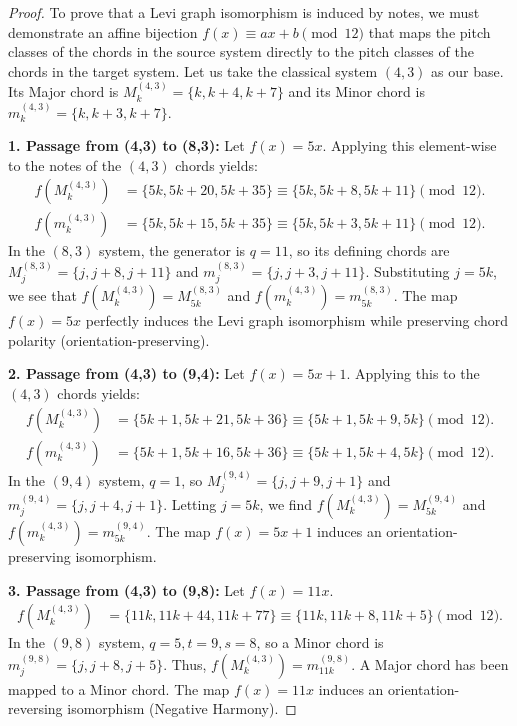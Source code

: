 \documentclass[10pt,a4paper]{amsart}
\begin{document}
\begin{proof}
To prove that a Levi graph isomorphism is induced by notes, we must demonstrate an affine bijection $f(x) \equiv ax+b \pmod{12}$ that maps the pitch classes of the chords in the source system directly to the pitch classes of the chords in the target system. Let us take the classical system $(4,3)$ as our base. Its Major chord is $M_k^{(4,3)} = \{k, k+4, k+7\}$ and its Minor chord is $m_k^{(4,3)} = \{k, k+3, k+7\}$.

\textbf{1. Passage from (4,3) to (8,3):}
Let $f(x) = 5x$. Applying this element-wise to the notes of the $(4,3)$ chords yields:
\begin{align*}
    f(M_k^{(4,3)}) &= \{5k, 5k+20, 5k+35\} \equiv \{5k, 5k+8, 5k+11\} \pmod{12}. \\
    f(m_k^{(4,3)}) &= \{5k, 5k+15, 5k+35\} \equiv \{5k, 5k+3, 5k+11\} \pmod{12}.
\end{align*}
In the $(8,3)$ system, the generator is $q=11$, so its defining chords are $M_j^{(8,3)} = \{j, j+8, j+11\}$ and $m_j^{(8,3)} = \{j, j+3, j+11\}$. 
Substituting $j = 5k$, we see that $f(M_k^{(4,3)}) = M_{5k}^{(8,3)}$ and $f(m_k^{(4,3)}) = m_{5k}^{(8,3)}$. The map $f(x)=5x$ perfectly induces the Levi graph isomorphism while preserving chord polarity (orientation-preserving).

\textbf{2. Passage from (4,3) to (9,4):}
Let $f(x) = 5x+1$. Applying this to the $(4,3)$ chords yields:
\begin{align*}
    f(M_k^{(4,3)}) &= \{5k+1, 5k+21, 5k+36\} \equiv \{5k+1, 5k+9, 5k\} \pmod{12}. \\
    f(m_k^{(4,3)}) &= \{5k+1, 5k+16, 5k+36\} \equiv \{5k+1, 5k+4, 5k\} \pmod{12}.
\end{align*}
In the $(9,4)$ system, $q=1$, so $M_j^{(9,4)} = \{j, j+9, j+1\}$ and $m_j^{(9,4)} = \{j, j+4, j+1\}$. 
Letting $j = 5k$, we find $f(M_k^{(4,3)}) = M_{5k}^{(9,4)}$ and $f(m_k^{(4,3)}) = m_{5k}^{(9,4)}$. The map $f(x)=5x+1$ induces an orientation-preserving isomorphism.

\textbf{3. Passage from (4,3) to (9,8):}
Let $f(x) = 11x$. 
\begin{align*}
    f(M_k^{(4,3)}) &= \{11k, 11k+44, 11k+77\} \equiv \{11k, 11k+8, 11k+5\} \pmod{12}. 
\end{align*}
In the $(9,8)$ system, $q=5, t=9, s=8$, so a Minor chord is $m_j^{(9,8)} = \{j, j+8, j+5\}$. 
Thus, $f(M_k^{(4,3)}) = m_{11k}^{(9,8)}$. A Major chord has been mapped to a Minor chord. The map $f(x)=11x$ induces an orientation-reversing isomorphism (Negative Harmony).


\end{proof}
\end{document}
